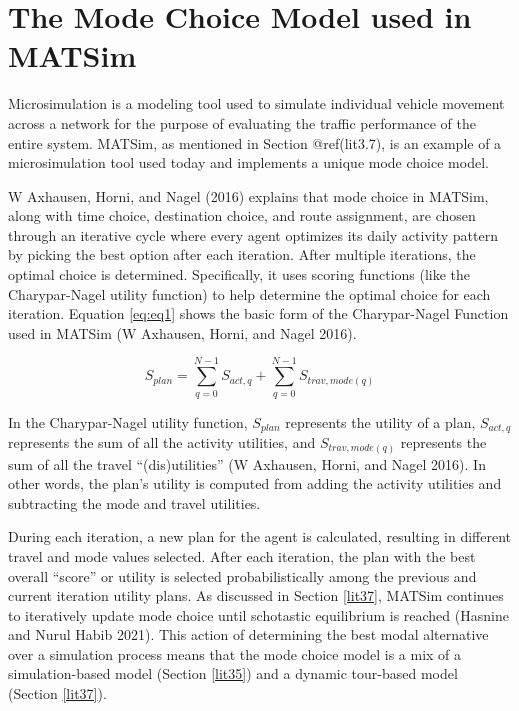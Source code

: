 \documentclass[12pt, oneside, openright]{byuthesis}
\begin{document}
\hypertarget{lit6}{%
\section{The Mode Choice Model used in MATSim}\label{lit6}}

Microsimulation is a modeling tool used to simulate individual vehicle movement across a network for the purpose of evaluating the traffic performance of the entire system. MATSim, as mentioned in Section @ref(lit3.7), is an example of a microsimulation tool used today and implements a unique mode choice model.

W Axhausen, Horni, and Nagel (2016) explains that mode choice in MATSim, along with time choice, destination choice, and route assignment, are chosen through an iterative cycle where every agent optimizes its daily activity pattern by picking the best option after each iteration. After multiple iterations, the optimal choice is determined. Specifically, it uses scoring functions (like the Charypar-Nagel utility function) to help determine the optimal choice for each iteration. Equation \eqref{eq:eq1} shows the basic form of the Charypar-Nagel Function used in MATSim (W Axhausen, Horni, and Nagel 2016).

\begin{equation} 
  S_{plan} = \sum_{q=0}^{N-1} S_{act,q} + \sum_{q=0}^{N-1} S_{trav,mode(q)}
  \label{eq:eq1}
\end{equation}

In the Charypar-Nagel utility function, \(S_{plan}\) represents the utility of a plan, \(S_{act,q}\) represents the sum of all the activity utilities, and \(S_{trav,mode(q)}\) represents the sum of all the travel ``(dis)utilities'' (W Axhausen, Horni, and Nagel 2016). In other words, the plan's utility is computed from adding the activity utilities and subtracting the mode and travel utilities.

During each iteration, a new plan for the agent is calculated, resulting in different travel and mode values selected. After each iteration, the plan with the best overall ``score'' or utility is selected probabilistically among the previous and current iteration utility plans. As discussed in Section \ref{lit37}, MATSim continues to iteratively update mode choice until schotastic equilibrium is reached (Hasnine and Nurul Habib 2021). This action of determining the best modal alternative over a simulation process means that the mode choice model is a mix of a simulation-based model (Section \ref{lit35}) and a dynamic tour-based model (Section \ref{lit37}).
\end{document}
